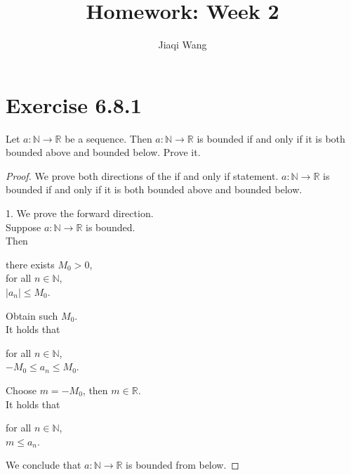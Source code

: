 \documentclass{article}
\title{Homework: Week 2}
\author{Jiaqi Wang}
\newcommand{\N}{\mathbb{N}}
\newcommand{\R}{\mathbb{R}}
\theoremstyle{mytheoremstyle}
\theoremstyle{mytheoremstyle}
\theoremstyle{myproblemstyle}
\begin{document}
    \maketitle

    \section{Exercise 6.8.1}
    \begin{problem}
        Let $a: \N \to \R$ be a sequence. Then $a: \N \to \R$ is bounded if and only if it is both bounded above and bounded below. Prove it.
    \end{problem}
    \begin{proof}
        We prove both directions of the if and only if statement.
        $a: \N \to \R$ is bounded if and only if it is both bounded above and bounded below.
        
        1. We prove the forward direction. \\
        Suppose $a: \N \to \R$ is bounded. \\
        Then 
        \begin{center}
            \parbox{\linewidth}{
                \linewidth
                there exists $M_0 > 0$, \\
                \hspace*{1em} for all $n \in \N$, \\
                \hspace*{2em} $|a_n| \leq M_0$.
            }
        \end{center}
        Obtain such $M_0$. \\ 
        It holds that
        \begin{center}
            \parbox{\linewidth}{
                \linewidth
                for all $n \in \N$, \\
                \hspace*{1em} $-M_0 \leq a_n \leq M_0$.
            }
        \end{center}
        Choose $m = -M_0$, then $m \in \R$. \\
        It holds that
        \begin{center}
            \parbox{\linewidth}{
                \linewidth
                for all $n \in \N$, \\
                \hspace*{1em} $m \leq a_n$.
            }
        \end{center}
        We conclude that $a:\N \to \R$ is bounded from below.


\end{proof}
\end{document}
